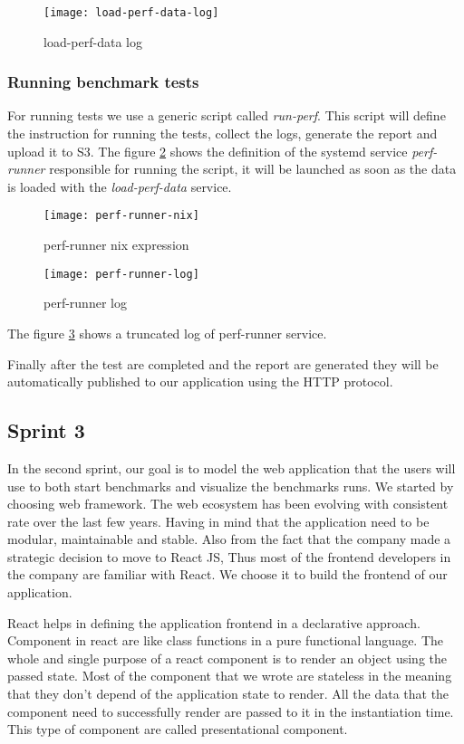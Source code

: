 \begin{figure}[h]
  \centerline{\texttt{[image: load-perf-data-log]}}
\caption{load-perf-data log}
\label{fig:load-perf-data-log}
\end{figure}

\subsubsection{Running benchmark tests}
For running tests we use a generic script called \emph{run-perf}. This script will
define the instruction for running the tests, collect the logs, generate the
report and upload it to S3. The figure
\hyperref[fig:perf-runner-nix]{\ref{fig:perf-runner-nix}} shows the definition of
the systemd service \emph{perf-runner} responsible for running the script, it
will be launched as soon as the data is loaded with the \emph{load-perf-data}
service.
\begin{figure}[h]
  \texttt{[image: perf-runner-nix]}
  \caption{perf-runner nix expression}
\label{fig:perf-runner-nix}
\end{figure}

\begin{figure}[h]
  \texttt{[image: perf-runner-log]}
  \caption{perf-runner log}
\label{fig:perf-runner-log}
\end{figure}
The figure \hyperref[fig:perf-runner-log]{\ref{fig:perf-runner-log}} shows a
truncated log of perf-runner service.

Finally after the test are completed and the report are generated they will be
automatically published to our application using the HTTP protocol.

\subsection{Sprint 3}
In the second sprint, our goal is to model the web application that the users
will use to both start benchmarks and visualize the benchmarks runs. We started
by choosing web framework.
The web ecosystem has been evolving with consistent rate over the last few
years. Having in mind that the application need to be modular, maintainable and
stable. Also from the fact that the company made a strategic decision to move to
React JS, Thus most of the frontend developers in the company are familiar with
React. We choose it to build the frontend of our application.

React helps in defining the application frontend in a declarative approach.
Component in react are like class functions in a pure functional language. The
whole and single purpose of a react component is to render an object using the
passed state. Most of the component that we wrote are stateless in the meaning
that they don't depend of the application state to render. All the data that the
component need to successfully render are passed to it in the instantiation
time. This type of component are called presentational component.

